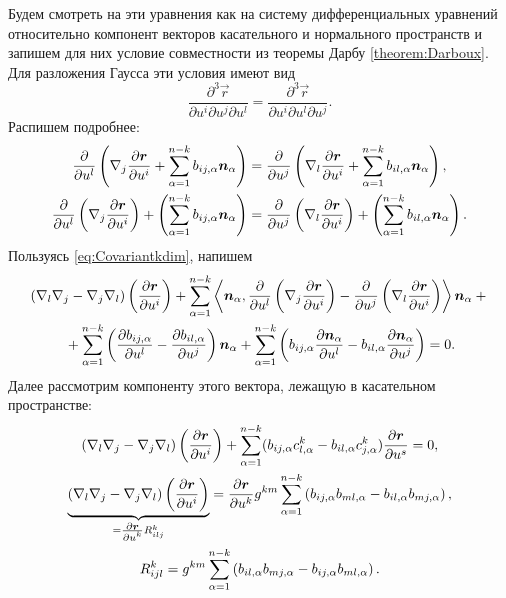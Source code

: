 Будем смотреть на эти уравнения как на систему дифференциальных уравнений относительно компонент векторов касательного и нормального пространств и запишем для них условие совместности из теоремы Дарбу \ref{theorem:Darboux}. Для разложения Гаусса эти условия имеют вид
\[
	\frac{\partial^3\vec{r}}{\partial u^i\partial u^j\partial u^l} = \frac{\partial^3\vec{r}}{\partial u^i\partial u^l\partial u^j}.
\]
Распишем подробнее:
\begin{gather*}
	\frac{\partial}{\partial u^l}\left(\nabla_j\frac{\partial\boldsymbol{r}}{\partial u^i} + \sum_{\alpha = 1}^{n - k}b_{ij, \alpha}\boldsymbol{n}_\alpha\right) = \frac{\partial}{\partial u^j}\left(\nabla_l\frac{\partial\boldsymbol{r}}{\partial u^i} + \sum_{\alpha = 1}^{n - k}b_{il, \alpha}\boldsymbol{n}_\alpha\right),\\
	\frac{\partial}{\partial u^l}\left(\nabla_j\frac{\partial\boldsymbol{r}}{\partial u^i}\right) + \left(\sum_{\alpha = 1}^{n - k}b_{ij, \alpha}\boldsymbol{n}_\alpha\right) = \frac{\partial}{\partial u^j}\left(\nabla_l\frac{\partial\boldsymbol{r}}{\partial u^i}\right) + \left(\sum_{\alpha = 1}^{n - k}b_{il, \alpha}\boldsymbol{n}_\alpha\right).
\end{gather*}
Пользуясь \eqref{eq:Covariantkdim}, напишем
\begin{multline} \label{eq:GaussCodazzikdim}
	(\nabla_l\nabla_j - \nabla_j\nabla_l)\left(\frac{\partial\boldsymbol{r}}{\partial u^i}\right) + \sum_{\alpha = 1}^{n - k}\left\langle\boldsymbol{n}_\alpha, \frac{\partial}{\partial u^l}\left(\nabla_j\frac{\partial\boldsymbol{r}}{\partial u^i}\right) - \frac{\partial}{\partial u^j}\left(\nabla_l\frac{\partial\boldsymbol{r}}{\partial u^i}\right)\right\rangle\boldsymbol{n}_\alpha + {}\\{} + \sum_{\alpha = 1}^{n - k}\left(\frac{\partial b_{ij, \alpha}}{\partial u^l} - \frac{\partial b_{il, \alpha}}{\partial u^j}\right)\boldsymbol{n}_\alpha + \sum_{\alpha = 1}^{n - k}\left(b_{ij, \alpha}\frac{\partial\boldsymbol{n}_\alpha}{\partial u^l} - b_{il, \alpha}\frac{\partial\boldsymbol{n}_\alpha}{\partial u^j}\right) = 0.
\end{multline}
Далее рассмотрим компоненту этого вектора, лежащую в касательном пространстве:
\begin{gather*}
	(\nabla_l\nabla_j - \nabla_j\nabla_l)\left(\frac{\partial\boldsymbol{r}}{\partial u^i}\right) + \sum_{\alpha = 1}^{n - k}(b_{ij, \alpha}c^k_{l, \alpha} - b_{il, \alpha}c^k_{j, \alpha})\frac{\partial\boldsymbol{r}}{\partial u^s} = 0,\\
	{\underbrace{(\nabla_l\nabla_j - \nabla_j\nabla_l)\left(\frac{\partial\boldsymbol{r}}{\partial u^i}\right)}_{= \frac{\scriptstyle\partial\boldsymbol{r}}{\scriptstyle\partial u^k}R^k_{ilj}}} = \frac{\partial\boldsymbol{r}}{\partial u^k}g^{km}\sum_{\alpha = 1}^{n - k}\left(b_{ij, \alpha}b_{ml, \alpha} - b_{il, \alpha}b_{mj, \alpha}\right),\\
	R^k_{ijl} = g^{km}\sum_{\alpha = 1}^{n - k}\left(b_{il, \alpha}b_{mj, \alpha} - b_{ij, \alpha}b_{ml, \alpha}\right).
\end{gather*}

